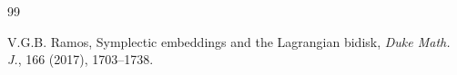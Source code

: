 \documentclass[12pt]{amsart}
\theoremstyle{definition}
\begin{document}
\begin{thebibliography} {99}

















 V.G.B. Ramos, Symplectic embeddings and the Lagrangian bidisk, {\em Duke Math. J.}, 166 (2017), 1703--1738.



\end{thebibliography}
\end{document}
